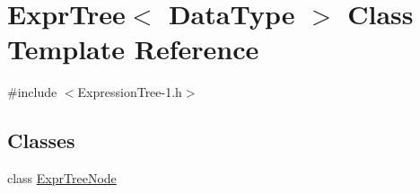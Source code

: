 \hypertarget{class_expr_tree}{\section{Expr\+Tree$<$ Data\+Type $>$ Class Template Reference}
\label{class_expr_tree}
}


{\ttfamily \#include $<$Expression\+Tree-\/1.\+h$>$}

\subsection*{Classes}
\begin{DoxyCompactItemize}
\item 
class \hyperlink{class_expr_tree_1_1_expr_tree_node}{Expr\+Tree\+Node}
\end{DoxyCompactItemize}
